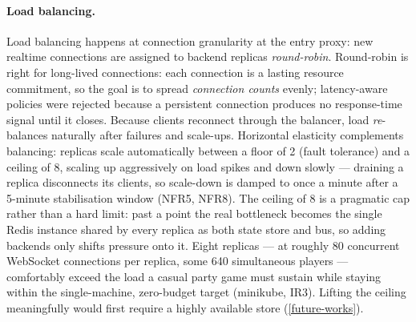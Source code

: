 \documentclass{scrartcl}
\begin{document}
\paragraph{Load balancing.}
Load balancing happens at connection granularity at the entry proxy: new realtime
connections are assigned to backend replicas \emph{round-robin}. Round-robin is
right for long-lived connections: each connection is a lasting resource
commitment, so the goal is to spread \emph{connection counts} evenly; latency-aware
policies were rejected because a persistent connection produces no response-time
signal until it closes. Because clients reconnect through the balancer, load
\emph{re}-balances naturally after failures and scale-ups. Horizontal elasticity
complements balancing: replicas scale automatically between a floor of 2 (fault
tolerance) and a ceiling of 8, scaling up aggressively on load spikes and down
slowly --- draining a replica disconnects its clients, so scale-down is damped to
once a minute after a 5-minute stabilisation window (NFR5, NFR8). The ceiling of
8 is a pragmatic cap rather than a hard limit: past a point the real bottleneck
becomes the single Redis instance shared by every replica as both state store and
bus, so adding backends only shifts pressure onto it. Eight replicas --- at
roughly 80 concurrent WebSocket connections per replica, some 640 simultaneous
players --- comfortably exceed the load a casual party game must sustain while
staying within the single-machine, zero-budget target (minikube, IR3). Lifting
the ceiling meaningfully would first require a highly available store
(\cref{future-works}).
\end{document}
